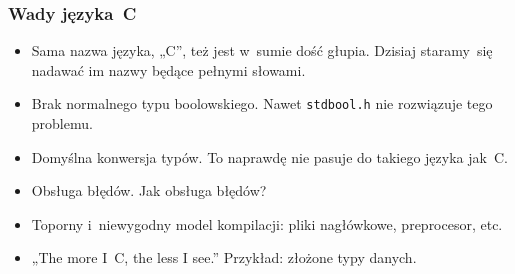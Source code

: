 \documentclass[10pt,t]{beamer}
\begin{document}
\begin{frame}
  \frametitle{Wady języka~C}


  \begin{itemize}

  \item  Sama nazwa języka, „C”, też jest w~sumie dość głupia. Dzisiaj
    staramy~się nadawać im nazwy będące pełnymi słowami.

  \item Brak normalnego typu boolowskiego. Nawet \texttt{stdbool.h} nie
    rozwiązuje tego problemu.

  \item Domyślna konwersja typów. To naprawdę nie pasuje do takiego
    języka jak~C.

  \item Obsługa błędów. Jak obsługa błędów?

  \item Toporny i~niewygodny model kompilacji: pliki nagłówkowe,
    preprocesor, etc.

  \item „The more I~C, the less I see.” Przykład: złożone typy danych.



  \end{itemize}

\end{frame}
\end{document}
